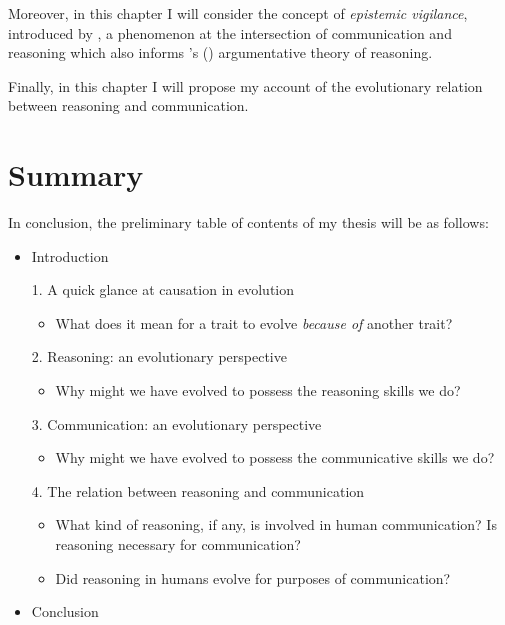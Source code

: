 \documentclass{article}
\newcommand{\poscite}[1]{\citeauthor{#1}'s (\citeyear{#1})}
\begin{document}
Moreover, in this chapter I will consider the concept of \emph{epistemic vigilance}, introduced by \citet{Sperber10}, a phenomenon at the intersection of communication and reasoning which also informs \poscite{MS11} argumentative theory of reasoning.

Finally, in this chapter I will propose my account of the evolutionary relation between reasoning and communication.

\section*{Summary}

In conclusion, the preliminary table of contents of my thesis will be as follows:
\begin{itemize}
    \item Introduction
    \item[1.] A quick glance at causation in evolution
        \begin{itemize}
            \item What does it mean for a trait to evolve \emph{because of} another trait?
        \end{itemize}
    \item [2.] Reasoning: an evolutionary perspective
        \begin{itemize}
            \item Why might we have evolved to possess the reasoning skills we do?
        \end{itemize}
    \item [3.] Communication: an evolutionary perspective
        \begin{itemize}
            \item Why might we have evolved to possess the communicative skills we do?
        \end{itemize}
    \item [4.] The relation between reasoning and communication
        \begin{itemize}
            \item What kind of reasoning, if any, is involved in human communication? Is reasoning necessary for communication?
            \item Did reasoning in humans evolve for purposes of communication?
        \end{itemize}
    \item Conclusion
\end{itemize}

\pagebreak

\nocite{*}
\printbibliography[title=Preliminary bibliography]
\end{document}
